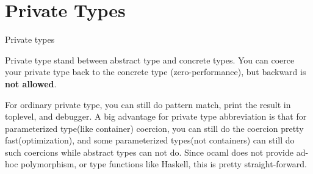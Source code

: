\section{Private Types}
\label{sec:fancy-types-1}


Private types 

Private type stand between abstract type and concrete types. You can
coerce your private type back to the concrete type (zero-performance),
but backward is \textbf{not allowed}.

For ordinary private type, you can still do pattern match, print the
result in toplevel, and debugger. A big advantage for private type
abbreviation is that for parameterized type(like container) coercion,
you can still do the coercion pretty fast(optimization), and some
parameterized types(not containers) can still do such coercions while
abstract types can not do. Since ocaml does not provide ad-hoc
polymorphism, or type functions like Haskell, this is pretty
straight-forward.

\inputminted[fontsize=\scriptsize, fontsize=\scriptsize, ]{ocaml}{./lang/code/priv.ml}

